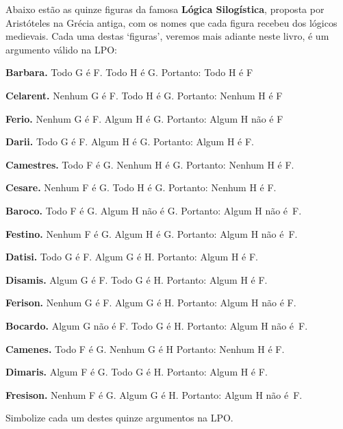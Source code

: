 \practiceproblems
\problempart
\label{pr.BarbaraEtc}
Abaixo estão as quinze figuras da famosa \textbf{Lógica Silogística}, proposta por Aristóteles na Grécia antiga, com os nomes que cada figura recebeu dos lógicos medievais.
Cada uma destas `figuras', veremos mais adiante neste livro, é um argumento válido na LPO:
\begin{earg}\footnotesize 
	\item \textbf{Barbara.} Todo G é F. Todo H é G. Portanto:  Todo H é F
	\item \textbf{Celarent.} Nenhum G é F. Todo H é G. Portanto: Nenhum H é F
	\item \textbf{Ferio.} Nenhum G é F. Algum H é G. Portanto: Algum H não é F
	\item \textbf{Darii.} Todo G é F. Algum H é G. Portanto: Algum H é F.
	\item \textbf{Camestres.} Todo F é G. Nenhum H é G. Portanto: Nenhum H é F.
	\item \textbf{Cesare.} Nenhum F é G. Todo H é G. Portanto: Nenhum H é F.
	\item \textbf{Baroco.} Todo F é G. Algum H não é G. Portanto: Algum H não é~F.
	\item \textbf{Festino.} Nenhum F é G. Algum H é G. Portanto: Algum H não é~F.
	\item \textbf{Datisi.} Todo G é F. Algum G é H. Portanto: Algum H é F.
	\item \textbf{Disamis.} Algum G é F. Todo G é H. Portanto: Algum H é F.
	\item \textbf{Ferison.} Nenhum G é F. Algum G é H. Portanto: Algum H não é F.
	\item \textbf{Bocardo.} Algum G não é F. Todo G é H. Portanto:  Algum H não é~F.
	\item \textbf{Camenes.} Todo F é G. Nenhum G é H Portanto: Nenhum H é F.
	\item \textbf{Dimaris.} Algum F é G. Todo G é H. Portanto: Algum H é F.
	\item \textbf{Fresison.} Nenhum F é G. Algum G é H. Portanto: Algum H não é~F.
\end{earg}
Simbolize cada um destes quinze argumentos na LPO.

\

